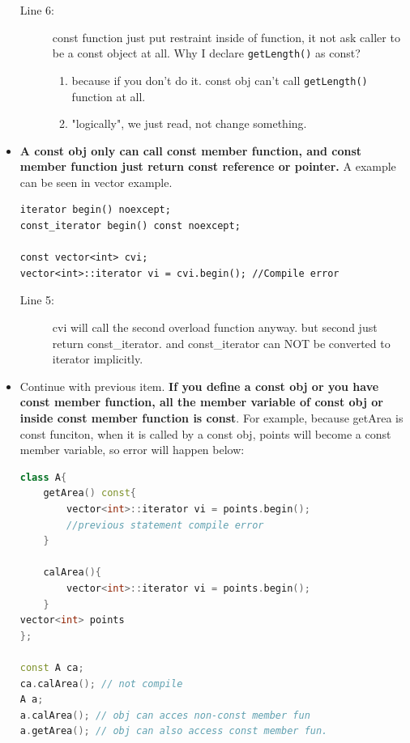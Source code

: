 \documentclass[a4paper,11pt,twoside]{book}
\begin{document}
\begin{itemize}
\begin{description}
	\item[Line 6:] const function just put restraint inside of function, it not ask caller to be a const object at all. Why I declare \texttt{getLength()} as const?
	\begin{enumerate}
		\item because if you don't do it. const obj can't call \texttt{getLength()} function at all. 
		\item "logically", we just read, not change something.
	\end{enumerate}
\end{description}
	
	
	
	
	\item \textbf{A const obj only can call const member function, and const member function just return const reference or pointer.} A example can be seen in vector example.  
	
\begin{lstlisting}
iterator begin() noexcept;
const_iterator begin() const noexcept;
	
const vector<int> cvi;
vector<int>::iterator vi = cvi.begin(); //Compile error
\end{lstlisting}
\begin{description}
	\item[Line 5:] cvi will call the second overload function anyway. but second just return const\_iterator. and const\_iterator can NOT be converted to iterator implicitly.
\end{description}
	
	\item Continue with previous item.\textbf{ If you define a const obj or you have const member function, all the member variable of const obj or inside const member function is const}. For example, because getArea is const funciton, when it is called by a const obj, points will become a const member variable, so error will happen below: 
	
\begin{lstlisting}[frame=single, language=c++]
class A{
	getArea() const{
		vector<int>::iterator vi = points.begin();
		//previous statement compile error
	}
	
	calArea(){
		vector<int>::iterator vi = points.begin();
	}
vector<int> points
};
	
const A ca;
ca.calArea(); // not compile	
A a;
a.calArea(); // obj can acces non-const member fun
a.getArea(); // obj can also access const member fun.
		      

\end{lstlisting}
\end{itemize}
\end{document}
